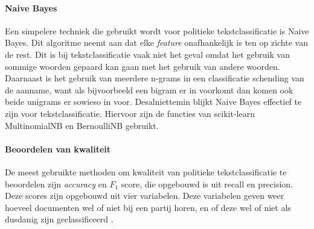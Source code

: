 \paragraph{Naive Bayes}
Een simpelere techniek die gebruikt wordt voor politieke tekstclassificatie is Naive Bayes. Dit algoritme neemt aan dat elke \textit{feature} onafhankelijk is ten op zichte van de rest. Dit is bij tekstclassificatie vaak niet het geval omdat het gebruik van sommige woorden gepaard kan gaan met het gebruik van andere woorden. Daarnaast is het gebruik van meerdere n-grams in een classificatie schending van de aanname, want als bijvoorbeeld een bigram er in voorkomt dan komen ook beide unigrams er sowieso in voor. Desalniettemin blijkt Naive Bayes effectief te zijn voor tekstclassificatie\cite{scikit-learn,bhand}. Hiervoor zijn de functies van scikit-learn MultinomialNB en BernoulliNB gebruikt.\cite{scikit-learn,bhand}\par

\paragraph{Beoordelen van kwaliteit}
De meest gebruikte methoden om kwaliteit van politieke tekstclassificatie te beoordelen zijn \textit{accuracy} en $F_1$ score, die opgebouwd is uit recall en precision. Deze scores zijn opgebouwd uit vier variabelen. Deze variabelen geven weer hoeveel documenten wel of niet bij een partij horen, en of deze wel of niet als dusdanig zijn geclassificeerd \cite{Manning:2008:IIR:1394399} .\par

